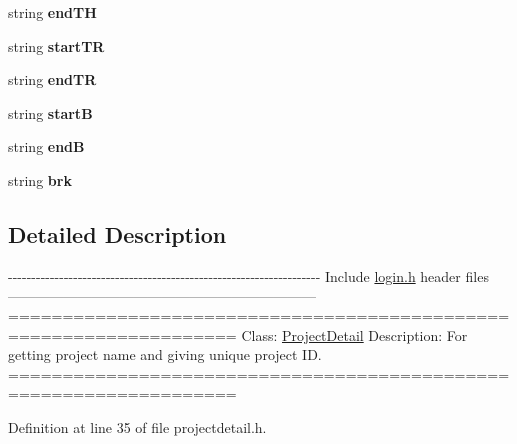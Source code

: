 \begin{DoxyCompactItemize}
\item 
\hypertarget{classPageStructureMaker_aa244b4ef71850dc76fcfb5157bcaf8fc}{string {\bfseries end\-T\-H}}\label{classPageStructureMaker_aa244b4ef71850dc76fcfb5157bcaf8fc}

\item 
\hypertarget{classPageStructureMaker_aa59b4949d26fab5a72710fa9fc3e8ea9}{string {\bfseries start\-T\-R}}\label{classPageStructureMaker_aa59b4949d26fab5a72710fa9fc3e8ea9}

\item 
\hypertarget{classPageStructureMaker_afee49ebdcbc0971142fcf7eae8baa306}{string {\bfseries end\-T\-R}}\label{classPageStructureMaker_afee49ebdcbc0971142fcf7eae8baa306}

\item 
\hypertarget{classPageStructureMaker_aa0f624b485f07f6e19151b1df3dc59a3}{string {\bfseries start\-B}}\label{classPageStructureMaker_aa0f624b485f07f6e19151b1df3dc59a3}

\item 
\hypertarget{classPageStructureMaker_ad46c3195310a1f0226e21d2eb5befb00}{string {\bfseries end\-B}}\label{classPageStructureMaker_ad46c3195310a1f0226e21d2eb5befb00}

\item 
\hypertarget{classPageStructureMaker_a63911cb925ccdc6c879905a677ed8881}{string {\bfseries brk}}\label{classPageStructureMaker_a63911cb925ccdc6c879905a677ed8881}

\end{DoxyCompactItemize}


\subsection{Detailed Description}
-\/-\/-\/-\/-\/-\/-\/-\/-\/-\/-\/-\/-\/-\/-\/-\/-\/-\/-\/-\/-\/-\/-\/-\/-\/-\/-\/-\/-\/-\/-\/-\/-\/-\/-\/-\/-\/-\/-\/-\/-\/-\/-\/-\/-\/-\/-\/-\/-\/-\/-\/-\/-\/-\/-\/-\/-\/-\/-\/-\/-\/-\/-\/-\/-\/-\/-\/ Include \hyperlink{login_8h_source}{login.\-h} header files ------------------------------------------------------------------ =================================================================== Class\-: \hyperlink{classProjectDetail}{Project\-Detail} Description\-: For getting project name and giving unique project I\-D. =================================================================== 

Definition at line 35 of file projectdetail.\-h.



